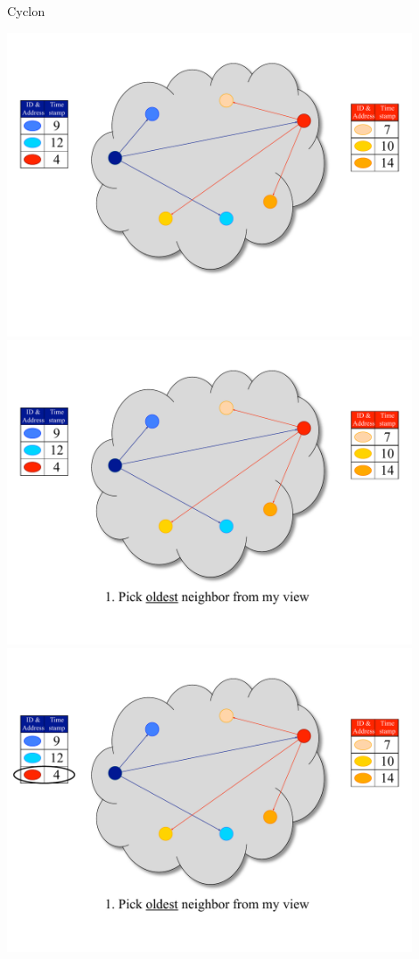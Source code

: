 \begin{frame}{Cyclon}
	
\begin{overprint}
\includegraphics[width=0.9\textwidth]{1_cyclon}
\includegraphics[width=0.9\textwidth]{2_cyclon}
\includegraphics[width=0.9\textwidth]{3_cyclon}

\end{overprint}
\end{frame}
